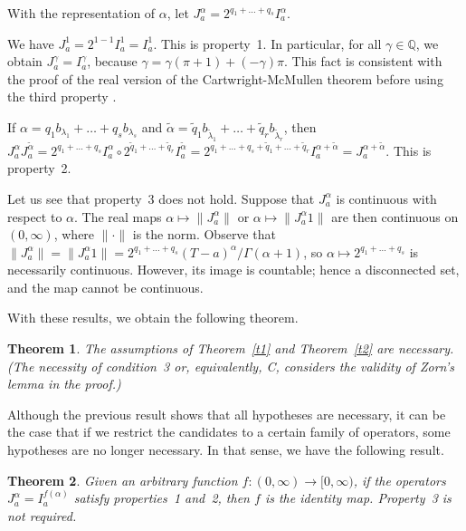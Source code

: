 \documentclass[12pt,reqno]{amsart}
\theoremstyle{plain}
\newtheorem{theorem}{Theorem}[section] %
\numberwithin{equation}{section} %
\begin{document}
With the representation of $\alpha$, let $J_a^\alpha=2^{q_1+\ldots+q_s} I_a^{\alpha}$. 

We have $J_a^1=2^{1-1} I_a^{1}=I_a^1$. This is property~1. In particular, for all $\gamma\in\mathbb{Q}$, we obtain $J_a^\gamma= I_a^\gamma$, because $\gamma=\gamma (\pi+1)+(-\gamma)\pi$. This fact is consistent with the proof of the real version of the Cartwright-McMullen theorem before using the third property \cite{tese,cao_jie}.

If $\alpha=q_1b_{\lambda_1}+\ldots+q_s b_{\lambda_s}$ and $\tilde{\alpha}=\tilde{q}_1 b_{\tilde{\lambda}_1}+\ldots+\tilde{q}_r b_{\tilde{\lambda}_r}$, then $J_a^{\alpha}J_a^{\tilde{\alpha}}=2^{q_1+\ldots+q_s} I_a^{\alpha} \circ 2^{\tilde{q}_1+\ldots+\tilde{q}_r} I_a^{\tilde{\alpha}}=2^{q_1+\ldots+q_s+\tilde{q}_1+\ldots+\tilde{q}_r} I_a^{\alpha+\tilde{\alpha}}=J_a^{\alpha+\tilde{\alpha}}$. This is property~2.

Let us see that property~3 does not hold. Suppose that $J_a^\alpha$ is continuous with respect to $\alpha$. The real maps $\alpha\mapsto \|J_a^\alpha\|$ or $\alpha\mapsto \|J_a^\alpha 1\|$ are then continuous on $(0,\infty)$, where $\|\cdot\|$ is the norm. Observe that $\|J_a^{\alpha}\|=\|J_a^\alpha 1\|=2^{q_1+\ldots+q_s} (T-a)^{\alpha}/\Gamma(\alpha+1)$, so $\alpha\mapsto 2^{q_1+\ldots+q_s}$ is necessarily continuous. However, its image is countable; hence a disconnected set, and the map cannot be continuous.

With these results, we obtain the following theorem.

\begin{theorem} \label{th_main}
The assumptions of Theorem~\ref{t1} and Theorem~\ref{t2} are necessary. (The necessity of condition~3 or, equivalently, C, considers the validity of Zorn's lemma in the proof.)
\end{theorem}

Although the previous result shows that all hypotheses are necessary, it can be the case that if we restrict the candidates to a certain family of operators, some hypotheses are no longer necessary. In that sense, we have the following result.

\begin{theorem} \label{th222}
Given an arbitrary function $f:(0,\infty)\rightarrow [0,\infty)$, if the operators $J_a^\alpha= I_a^{f(\alpha)}$ satisfy properties~1 and~2, then $f$ is the identity map. Property~3 is not required. 
\end{theorem}
 
\end{document}
